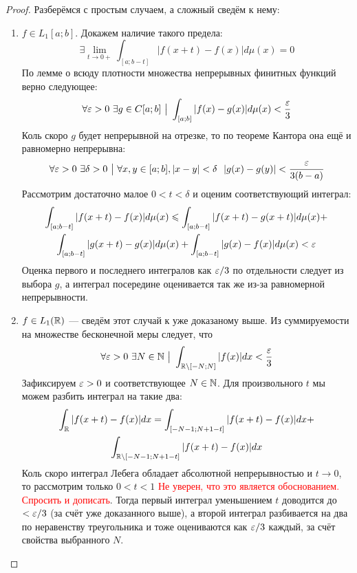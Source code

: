\begin{proof}
	Разберёмся с простым случаем, а сложный сведём к нему:
	\begin{enumerate}
		\item $f \in L_1[a; b]$. Докажем наличие такого предела:
		\[
			\exists \lim_{t \to 0+} \int_{[a; b - t]} |f(x + t) - f(x)|d\mu(x) = 0
		\]
		По лемме о всюду плотности множества непрерывных финитных функций верно следующее:
		\[
			\forall \varepsilon > 0\ \exists g \in C[a; b] \ \big|\  \int_{[a; b]} |f(x) - g(x)|d\mu(x) < \frac{\varepsilon}{3}
		\]
		Коль скоро $g$ будет непрерывной на отрезке, то по теореме Кантора она ещё и равномерно непрерывна:
		\[
			\forall \eps > 0\ \exists \delta > 0 \such \forall x, y \in [a; b], |x - y| < \delta\ \ |g(x) - g(y)| < \frac{\eps}{3(b - a)}
		\]
		Рассмотрим достаточно малое $0 < t < \delta$ и оценим соответствующий интеграл:
		\begin{multline*}
			\int_{[a; b - t]} |f(x + t) - f(x)|d\mu(x) \leqslant \int_{[a; b - t]} |f(x + t) - g(x + t)|d\mu(x) +
			\\
			\int_{[a; b - t]} |g(x + t) - g(x)|d\mu(x) + \int_{[a; b - t]} |g(x) - f(x)|d\mu(x) < \varepsilon
		\end{multline*}
		Оценка первого и последнего интегралов как $\varepsilon / 3$ по отдельности следует из выбора $g$, а интеграл посередине оценивается так же из-за равномерной непрерывности.
	
		\item $f \in L_1(\mathbb{R})$ --- сведём этот случай к уже доказаному выше. Из суммируемости на множестве бесконечной меры следует, что
		\[
			\forall \eps > 0\ \exists N \in \N \such \int_{\R \bs [-N; N]} |f(x)|dx < \frac{\eps}{3}
		\]
		Зафиксируем $\varepsilon > 0$ и соответствующее $N \in \mathbb{N}$. Для произвольного $t$ мы можем разбить интеграл на такие два:
		\begin{multline*}
			\int_{\mathbb{R}} |f(x + t) - f(x)|dx = \int_{[-N - 1; N + 1 - t]} |f(x + t) - f(x)|dx +
			\\
			\int_{\mathbb{R} \backslash [-N - 1; N + 1 - t]} |f(x + t) - f(x)|dx
		\end{multline*}
		Коль скоро интеграл Лебега обладает абсолютной непрерывностью и $t \to 0$, то рассмотрим только $0 < t < 1$ \textcolor{red}{Не уверен, что это является обоснованием. Спросить и дописать}. Тогда первый интеграл уменьшением $t$ доводится до $< \varepsilon / 3$ (за счёт уже доказанного выше), а второй интеграл разбивается на два по неравенству треугольника и тоже оцениваются как $\varepsilon / 3$ каждый, за счёт свойства выбранного $N$.
	\end{enumerate}
\end{proof}

